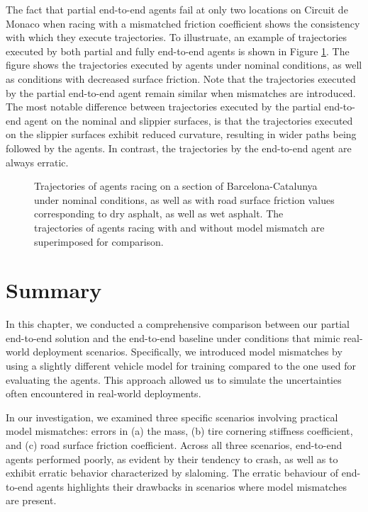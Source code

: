 The fact that partial end-to-end agents fail at only two locations on Circuit de Monaco when racing with a mismatched friction coefficient shows the consistency with
which they execute trajectories.
To illustruate, an example of trajectories executed by both partial and fully end-to-end agents is shown in Figure \ref{fig:mu_lap}.
The figure shows the trajectories executed by agents under nominal conditions, as well as conditions with decreased surface friction.
Note that the trajectories executed by the partial end-to-end agent remain similar when mismatches are introduced.
The most notable difference between trajectories executed by the partial end-to-end agent on the nominal and slippier surfaces, is that the trajectories executed on the slippier surfaces exhibit reduced curvature, resulting in wider paths being followed by the agents.
In contrast, the trajectories by the end-to-end agent are always erratic.

\begin{figure}[htb!]
    \centering
    
    \caption[Trajectories of agents racing with a decreased road surface friction coefficient]{Trajectories of agents racing on a section of Barcelona-Catalunya under nominal conditions, as well as with road surface friction values corresponding to dry asphalt, as well as wet asphalt. The trajectories of agents racing with and without model mismatch are superimposed for comparison.}
    \label{fig:mu_lap}
\end{figure}

\section{Summary}

In this chapter, we conducted a comprehensive comparison between our partial end-to-end solution and the end-to-end baseline under conditions that mimic real-world deployment scenarios. 
Specifically, we introduced model mismatches by using a slightly different vehicle model for training compared to the one used for evaluating the agents. 
This approach allowed us to simulate the uncertainties often encountered in real-world deployments.


In our investigation, we examined three specific scenarios involving practical model mismatches: errors in (a) the mass, (b) tire cornering stiffness coefficient, and (c) road surface friction coefficient. 
Across all three scenarios, end-to-end agents performed poorly, as evident by their tendency to crash, as well as to exhibit erratic behavior characterized by slaloming.
The erratic behaviour of end-to-end agents highlights their drawbacks in scenarios where model mismatches are present.


